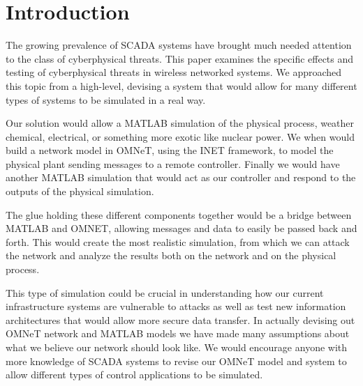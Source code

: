\section{Introduction}
The growing prevalence of SCADA systems have brought much needed attention to the class of cyberphysical threats.  This paper examines the specific effects and testing of cyberphysical threats in wireless networked systems. We approached this topic from a high-level, devising a system that would allow for many different types of systems to be simulated in a real way. 

Our solution would allow a MATLAB simulation of the physical process, weather chemical, electrical, or something more exotic like nuclear power. We when would build a network model in OMNeT, using the INET framework, to model the physical plant sending messages to a remote controller. Finally we would have another MATLAB simulation that would act as our controller and respond to the outputs of the physical simulation. 

The glue holding these different components together would be a bridge between MATLAB and OMNET, allowing messages and data to easily be passed back and forth. This would create the most realistic simulation, from which we can attack the network and analyze the results both on the network and on the physical process. 

This type of simulation could be crucial in understanding how our current infrastructure systems are vulnerable to attacks as well as test new information architectures that would allow more secure data transfer. In actually devising out OMNeT network and MATLAB models we have made many assumptions about what we believe our network should look like. We would encourage anyone with more knowledge of SCADA systems to revise our OMNeT model and system to allow different types of control applications to be simulated.  
